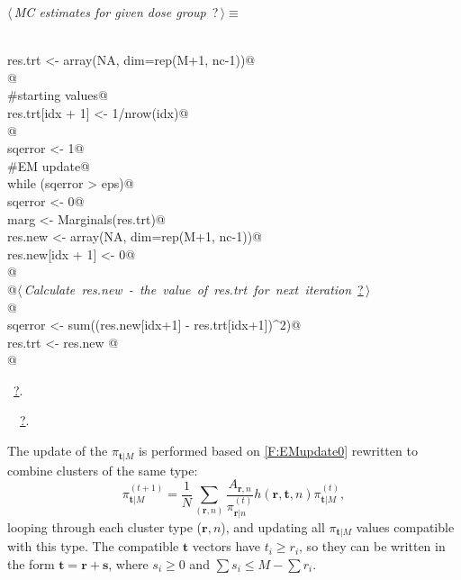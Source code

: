 \documentclass[reqno]{amsart}
\renewcommand{\NWtarget}[2]{\hypertarget{#1}{#2}}
\renewcommand{\NWlink}[2]{\hyperlink{#1}{#2}}
\newcommand{\rvec}{\mathbf{r}}
\newcommand{\svec}{\mathbf{s}}
\newcommand{\tvec}{\mathbf{t}}
\begin{document}
\begin{flushleft} \small\label{scrap32}\raggedright\small
\NWtarget{nuweb?}{} $\langle\,${\itshape MC estimates for given dose group}\nobreak\ {\footnotesize {?}}$\,\rangle\equiv$
\vspace{-1ex}
\begin{list}{}{} \item
\mbox{}\verb@@\\
\mbox{}\verb@  res.trt <- array(NA, dim=rep(M+1, nc-1))@\\
\mbox{}\verb@   @\\
\mbox{}\verb@  #starting values@\\
\mbox{}\verb@  res.trt[idx + 1] <- 1/nrow(idx)@\\
\mbox{}\verb@  @\\
\mbox{}\verb@  sqerror <- 1@\\
\mbox{}\verb@  #EM update@\\
\mbox{}\verb@  while (sqerror > eps){@\\
\mbox{}\verb@        sqerror <- 0@\\
\mbox{}\verb@        marg <- Marginals(res.trt)@\\
\mbox{}\verb@    res.new <- array(NA, dim=rep(M+1, nc-1))@\\
\mbox{}\verb@    res.new[idx + 1] <- 0@\\
\mbox{}\verb@    @\\
\mbox{}\verb@    @\hbox{$\langle\,${\itshape Calculate res.new - the value of res.trt for next iteration}\nobreak\ {\footnotesize \NWlink{nuweb?}{?}}$\,\rangle$}\verb@@\\
\mbox{}\verb@        @\\
\mbox{}\verb@    sqerror <- sum((res.new[idx+1] - res.trt[idx+1])^2)@\\
\mbox{}\verb@        res.trt <- res.new @\\
\mbox{}\verb@  }@\\
\mbox{}\verb@@{\NWsep}
\end{list}
\vspace{-1.5ex}
\footnotesize
\begin{list}{}{\setlength{\itemsep}{-\parsep}\setlength{\itemindent}{-\leftmargin}}
\item \NWtxtMacroRefIn\ \NWlink{nuweb?}{?}.
\item \NWtxtIdentsUsed\nobreak\  \verb@Marginals@\nobreak\ \NWlink{nuweb?}{?}.
\item{}
\end{list}
\vspace{4ex}
\end{flushleft}
The update of the $\pi_{\tvec|M}$ is performed based on \eqref{F:EMupdate0} rewritten to combine
clusters of the same type:
\begin{equation}\label{F:EMupdate1}
 \pi_{\tvec|M}^{(t+1)} = \frac{1}{N} \sum_{(\rvec,n)}\frac{A_{\rvec,n}}{\pi^{(t)}_{\rvec|n}} 
                                    h(\rvec,\tvec,n)\pi^{(t)}_{\tvec|M},
\end{equation}
looping through each cluster type ($\rvec, n$), and updating all $\pi_{\tvec|M}$ values compatible
with this type. The compatible $\tvec$ vectors have $t_i\geq r_i$, so they can be written in the form
$\tvec = \rvec + \svec$, where $s_i\geq 0$ and $\sum s_i \leq M-\sum r_i$.
\end{document}
